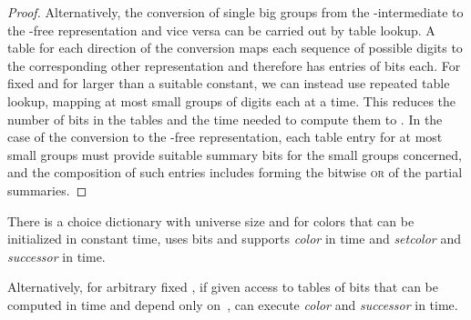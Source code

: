 \documentclass[envcountsame,envcountsect,undated,nolinenumbers]{lnthi}
\def\Tvn#1{\hbox{\textit{#1\/}}}
\begin{document}
\begin{proof}
Alternatively, the conversion of single big groups
from the -intermediate
to the -free representation
and vice versa can be carried out
by table lookup.
A table for each direction
of the conversion maps each sequence of
 possible digits
to the corresponding other
representation and therefore has  entries
of  bits each.
For fixed  and
for  larger than a suitable constant,
we can instead
use repeated table lookup,
mapping at most  small groups of
 digits each at a time.
This reduces the number of bits in the tables
and the time needed to compute them to
.
In the case of the conversion to the
-free representation, each table entry
for at most  small groups
must provide suitable summary bits for the
small groups concerned, and the composition 
of such entries includes forming the bitwise
\textsc{or} of the partial summaries.
\end{proof}

\begin{lemma}
\label{lem:smalltree}There is a choice dictionary  with
universe size  and for  colors
that can be initialized in constant time,
uses  bits and
supports \Tvn{color} in  time and
\Tvn{setcolor} 
and \Tvn{successor}
in  time.

Alternatively, for arbitrary fixed ,
if given access to tables of
 bits that can be computed in
 time and depend
only on~,  can execute
\Tvn{color} and \Tvn{successor}
in  time.
\end{lemma}
\end{document}
